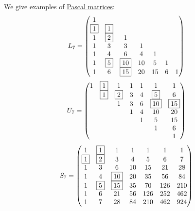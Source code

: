 \begin{example}\label{ex:con:pascals_triangle}
  We give examples of \hyperref[def:pascal_matrix]{Pascal matrices}:
  \begin{equation*}
    L_7
    =
    \begin{pmatrix}
      1        &          &           &        &        &      &   \\
      \fbox{1} & \fbox{1} &           &        &        &      &   \\
      1        & \fbox{2} & 1         &        &        &      &   \\
      1        & 3        & 3         & 1      &        &      &   \\
      1        & 4        & 6         & 4      & 1      &      &   \\
      1        & \fbox{5} & \fbox{10} & 10     & 5      & 1    &   \\
      1        & 6        & \fbox{15} & 20     & 15     & 6    & 1
    \end{pmatrix}
  \end{equation*}
  \begin{equation*}
    U_7
    =
    \begin{pmatrix}
      1        & \fbox{1} & 1         & 1      & 1      & 1         & 1         \\
               & \fbox{1} & \fbox{2}  & 3      & 4      & \fbox{5}  & 6         \\
               &          & 1         & 3      & 6      & \fbox{10} & \fbox{15} \\
               &          &           & 1      & 4      & 10        & 20        \\
               &          &           &        & 1      & 5         & 15        \\
               &          &           &        &        & 1         & 6         \\
               &          &           &        &        &           & 1
    \end{pmatrix}
  \end{equation*}
  \begin{equation*}
    S_7
    =
    \begin{pmatrix}
      1        & \fbox{1} & 1         & 1      & 1      & 1      & 1   \\
      \fbox{1} & \fbox{2} & 3         & 4      & 5      & 6      & 7   \\
      1        & 3        & 6         & 10     & 15     & 21     & 28  \\
      1        & 4        & \fbox{10} & 20     & 35     & 56     & 84  \\
      1        & \fbox{5} & \fbox{15} & 35     & 70     & 126    & 210 \\
      1        & 6        & 21        & 56     & 126    & 252    & 462 \\
      1        & 7        & 28        & 84     & 210    & 462    & 924
    \end{pmatrix}
  \end{equation*}
\end{example}

